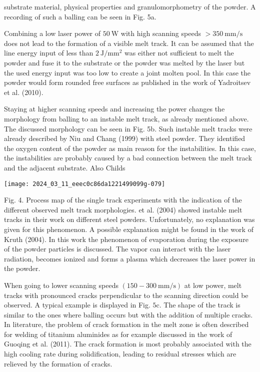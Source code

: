 \documentclass[10pt]{article}
\begin{document}
substrate material, physical properties and granulomorphometry of the powder. A recording of such a balling can be seen in Fig. 5a.

Combining a low laser power of $50 \mathrm{~W}$ with high scanning speeds $>350 \mathrm{~mm} / \mathrm{s}$ does not lead to the formation of a visible melt track. It can be assumed that the line energy input of less than $2 \mathrm{~J} / \mathrm{mm}^{2}$ was either not sufficient to melt the powder and fuse it to the substrate or the powder was melted by the laser but the used energy input was too low to create a joint molten pool. In this case the powder would form rounded free surfaces as published in the work of Yadroitsev et al. (2010).

Staying at higher scanning speeds and increasing the power changes the morphology from balling to an instable melt track, as already mentioned above. The discussed morphology can be seen in Fig. 5b. Such instable melt tracks were already described by Niu and Chang (1999) with steel powder. They identified the oxygen content of the powder as main reason for the instabilities. In this case, the instabilities are probably caused by a bad connection between the melt track and the adjacent substrate. Also Childs

\begin{center}
\texttt{[image: 2024\_03\_11\_eeec0c86da1221499099g-079]}
\end{center}

Fig. 4. Process map of the single track experiments with the indication of the different observed melt track morphologies. et al. (2004) showed instable melt tracks in their work on different steel powders. Unfortunately, no explanation was given for this phenomenon. A possible explanation might be found in the work of Kruth (2004). In this work the phenomenon of evaporation during the exposure of the powder particles is discussed. The vapor can interact with the laser radiation, becomes ionized and forms a plasma which decreases the laser power in the powder.

When going to lower scanning speeds $(150-300 \mathrm{~mm} / \mathrm{s})$ at low power, melt tracks with pronounced cracks perpendicular to the scanning direction could be observed. A typical example is displayed in Fig. $5 \mathrm{c}$. The shape of the track is similar to the ones where balling occurs but with the addition of multiple cracks. In literature, the problem of crack formation in the melt zone is often described for welding of titanium aluminides as for example discussed in the work of Guoqing et al. (2011). The crack formation is most probably associated with the high cooling rate during solidification, leading to residual stresses which are relieved by the formation of cracks.
\end{document}
